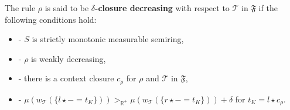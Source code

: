 \begin{definition}
    \noindent
    The rule $\rho$ is said to be
            \textbf{$\delta$-closure decreasing} with respect to $\mathcal{T}$ in $\mathfrak{F}$ if the following conditions hold:
            \begin{itemize}
                \item[]- $S$ is strictly monotonic measurable semiring,
                \item[]- $\rho$ is weakly decreasing,
                \item[]- there is a context closure $c_\rho$ for $\rho$ and $\mathcal{T}$ in $\mathfrak{F}$,
                \item[]- $ \mu(w_\mathcal{T}(\{l \mathop{\star} - \mathop{=} t_K\}))  >_{\mathbb{R}^+}  \mu(w_\mathcal{T}(\{r \mathop{\star} - \mathop{=} t_K\})) \mathop{+}\delta$ for $t_K \mathop{=} l \mathop{\star} c_\rho$.
            \end{itemize}
\end{definition}

